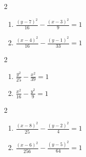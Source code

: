 \documentclass{ximera}
\begin{document}
\begin{multicols}{2}
\begin{enumerate}
\setcounter{enumi}{\value{HW}}

\item $\frac{(y - 7)^{2}}{16} - \frac{(x - 3)^{2}}{9} = 1$
\item $\frac{(x - 4)^{2}}{16} - \frac{(y - 1)^{2}}{33} = 1$

\setcounter{HW}{\value{enumi}}
\end{enumerate}
\end{multicols}

\begin{multicols}{2}
\begin{enumerate}
\setcounter{enumi}{\value{HW}}

\item $\frac{y^{2}}{25} - \frac{x^{2}}{39} = 1$
\item $\frac{x^{2}}{16} - \frac{y^{2}}{9} = 1$

\setcounter{HW}{\value{enumi}}
\end{enumerate}
\end{multicols}

\begin{multicols}{2}
\begin{enumerate}
\setcounter{enumi}{\value{HW}}

\item $\frac{(x - 8)^{2}}{25} - \frac{(y - 2)^{2}}{4} = 1$
\item $\frac{(x - 6)^{2}}{256} - \frac{(y - 5)^{2}}{64} = 1$

\setcounter{HW}{\value{enumi}}
\end{enumerate}
\end{multicols}
\end{document}
